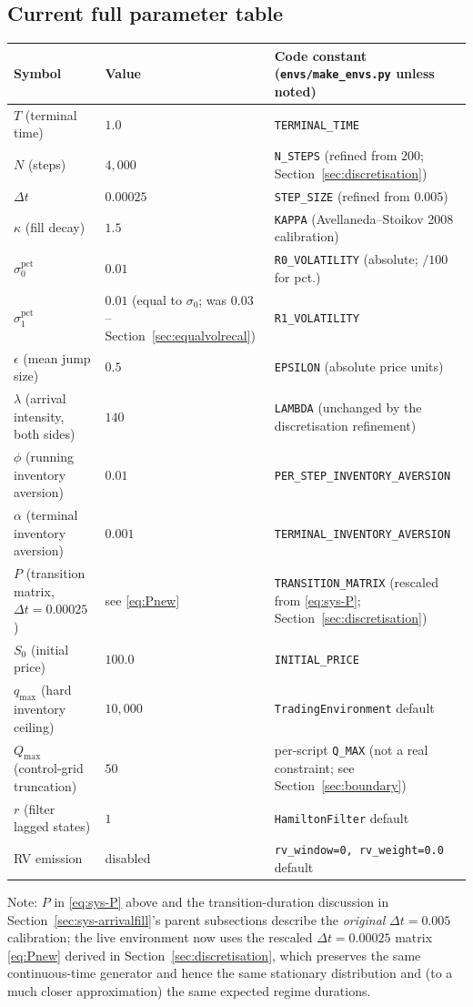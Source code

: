 \documentclass[11pt]{article}
\begin{document}
\subsection{Current full parameter table}
\label{sec:paramtable}
\begin{center}
\begin{tabular}{@{}lll@{}}
\toprule
Symbol & Value & Code constant (\texttt{envs/make\_envs.py} unless noted) \\
\midrule
$T$ (terminal time) & $1.0$ & \texttt{TERMINAL\_TIME} \\
$N$ (steps) & $4{,}000$ & \texttt{N\_STEPS} (refined from $200$; Section~\ref{sec:discretisation}) \\
$\Delta t$ & $0.00025$ & \texttt{STEP\_SIZE} (refined from $0.005$) \\
$\kappa$ (fill decay) & $1.5$ & \texttt{KAPPA} (Avellaneda--Stoikov 2008 calibration) \\
$\sigma_0^{\text{pct}}$ & $0.01$ & \texttt{R0\_VOLATILITY} (absolute; $/100$ for pct.) \\
$\sigma_1^{\text{pct}}$ & $0.01$ (equal to $\sigma_0$; was $0.03$ -- Section~\ref{sec:equalvolrecal}) & \texttt{R1\_VOLATILITY} \\
$\epsilon$ (mean jump size) & $0.5$ & \texttt{EPSILON} (absolute price units) \\
$\lambda$ (arrival intensity, both sides) & $140$ & \texttt{LAMBDA} (unchanged by the discretisation refinement) \\
$\phi$ (running inventory aversion) & $0.01$ & \texttt{PER\_STEP\_INVENTORY\_AVERSION} \\
$\alpha$ (terminal inventory aversion) & $0.001$ & \texttt{TERMINAL\_INVENTORY\_AVERSION} \\
$P$ (transition matrix, $\Delta t=0.00025$) & see \eqref{eq:Pnew} & \texttt{TRANSITION\_MATRIX} (rescaled from \eqref{eq:sys-P}; Section~\ref{sec:discretisation}) \\
$S_0$ (initial price) & $100.0$ & \texttt{INITIAL\_PRICE} \\
$q_{\max}$ (hard inventory ceiling) & $10{,}000$ & \texttt{TradingEnvironment} default \\
$Q_{\max}$ (control-grid truncation) & $50$ & per-script \texttt{Q\_MAX} (not a real constraint; see Section~\ref{sec:boundary}) \\
$r$ (filter lagged states) & $1$ & \texttt{HamiltonFilter} default \\
RV emission & disabled & \texttt{rv\_window=0, rv\_weight=0.0} default \\
\bottomrule
\end{tabular}
\end{center}
Note: $P$ in \eqref{eq:sys-P} above and the transition-duration discussion in Section~\ref{sec:sys-arrivalfill}'s parent subsections describe the \emph{original} $\Delta t=0.005$ calibration; the live environment now uses the rescaled $\Delta t=0.00025$ matrix \eqref{eq:Pnew} derived in Section~\ref{sec:discretisation}, which preserves the same continuous-time generator and hence the same stationary distribution and (to a much closer approximation) the same expected regime durations.
\end{document}
